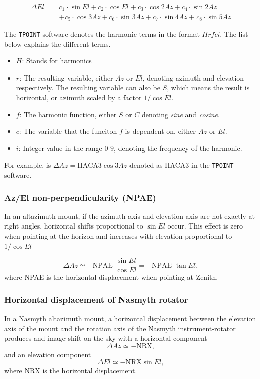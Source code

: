 \begin{align}\label{eq:analytical_el}
    \Delta El =&  c_1 \cdot \sin{El} + c_2 \cdot \cos{El}+ c_3 \cdot \cos{2Az} + c_4 \cdot \sin{2Az} \\
    &+ c_5 \cdot \cos{3Az} + c_6 \cdot \sin{3Az} + c_7 \cdot \sin{4Az} + c_8 \cdot \sin{5Az}  
\end{align}


The \texttt{TPOINT} software denotes the harmonic terms in the format $Hrfci$. The list below explains the different terms.

\begin{itemize}
    \item $H$: Stands for harmonics
    \item $r$: The resulting variable, either $Az$ or $El$, denoting azimuth and elevation respectively.
    The resulting variable can also be $S$, which means the result is horizontal, or azimuth scaled by a factor $1/\cos{El}$.
    \item $f$: The harmonic function, either $S$ or $C$ denoting \textit{sine} and \textit{cosine}.
    \item $c$: The variable that the funciton $f$ is dependent on, either $Az$ or $El$.
    \item $i$: Integer value in the range $0$-$9$, denoting the frequency of the harmonic.
\end{itemize}

For example, is $\Delta Az = \text{HACA3}\cos{3Az}$ denoted as HACA3 in the \texttt{TPOINT} software.

\subsubsection{Az/El non-perpendicularity (NPAE)}
In an altazimuth mount, if the azimuth axis and elevation axis are not exactly at
right angles, horizontal shifts proportional to $\sin{El}$ occur. This effect is zero when pointing at the horizon and increases with elevation proportional to $1/\cos{El}$

\begin{equation}
    \Delta Az \simeq - \text{NPAE } \frac{\sin{El}}{\cos{El}}= - \text{NPAE } \tan{El},
\end{equation}
where NPAE is the horizontal displacement when pointing at Zenith.

\subsubsection{Horizontal displacement of Nasmyth rotator}
In a Nasmyth altazimuth mount, a horizontal displacement between the elevation axis of the mount and the rotation axis of the Nasmyth instrument-rotator produces
and image shift on the sky with a horizontal component
\begin{equation}
    \Delta Az \simeq - \text{NRX},
\end{equation}
and an elevation component
\begin{equation}
    \Delta El \simeq - \text{NRX} \sin{El},
\end{equation}
where NRX is the horizontal displacement.

